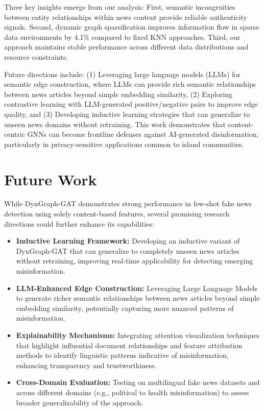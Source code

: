 \documentclass[conference]{IEEEtran}
\begin{document}
Three key insights emerge from our analysis: First, semantic incongruities between entity relationships within news content provide reliable authenticity signals. Second, dynamic graph sparsification improves information flow in sparse data environments by 4.1\% compared to fixed KNN approaches. Third, our approach maintains stable performance across different data distributions and resource constraints.

Future directions include: (1) Leveraging large language models (LLMs) for semantic edge construction, where LLMs can provide rich semantic relationships between news articles beyond simple embedding similarity, (2) Exploring contrastive learning with LLM-generated positive/negative pairs to improve edge quality, and (3) Developing inductive learning strategies that can generalize to unseen news domains without retraining. This work demonstrates that content-centric GNNs can become frontline defenses against AI-generated disinformation, particularly in privacy-sensitive applications common to island communities.

\section{Future Work}
While DynGraph-GAT demonstrates strong performance in few-shot fake news detection using solely content-based features, several promising research directions could further enhance its capabilities:
\begin{itemize}
    \item \textbf{Inductive Learning Framework:} Developing an inductive variant of DynGraph-GAT that can generalize to completely unseen news articles without retraining, improving real-time applicability for detecting emerging misinformation.
    \item \textbf{LLM-Enhanced Edge Construction:} Leveraging Large Language Models to generate richer semantic relationships between news articles beyond simple embedding similarity, potentially capturing more nuanced patterns of misinformation.
    \item \textbf{Explainability Mechanisms:} Integrating attention visualization techniques that highlight influential document relationships and feature attribution methods to identify linguistic patterns indicative of misinformation, enhancing transparency and trustworthiness.
    \item \textbf{Cross-Domain Evaluation:} Testing on multilingual fake news datasets and across different domains (e.g., political to health misinformation) to assess broader generalizability of the approach.
\end{itemize}
\end{document}
